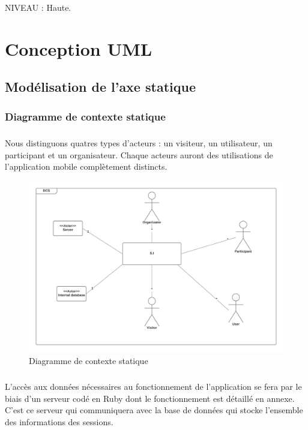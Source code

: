 \documentclass[titlepage, 12pt]{report}
\begin{document}
NIVEAU : Haute.


\chapter{Conception UML}

\section{Modélisation de l'axe statique}

\subsection{Diagramme de contexte statique}

\paragraph{}Nous distinguons quatres types d'acteurs : un visiteur, un utilisateur, un participant et un organisateur. Chaque acteurs auront des utilisations de l'application mobile complètement distincts. 

\begin{figure}
	\caption{Diagramme de contexte statique}
	\label{statique_diagram}
	\centering
	\includegraphics[scale=0.2]{Images/diagram/static_diagram.png}
\end{figure}

\clearpage

\paragraph{}L'accès aux données nécessaires au fonctionnement de l'application se fera par le biais d'un serveur codé en Ruby dont le fonctionnement est détaillé en annexe. C'est ce serveur qui communiquera avec la base de données qui stocke l'ensemble des informations des sessions.
\end{document}
